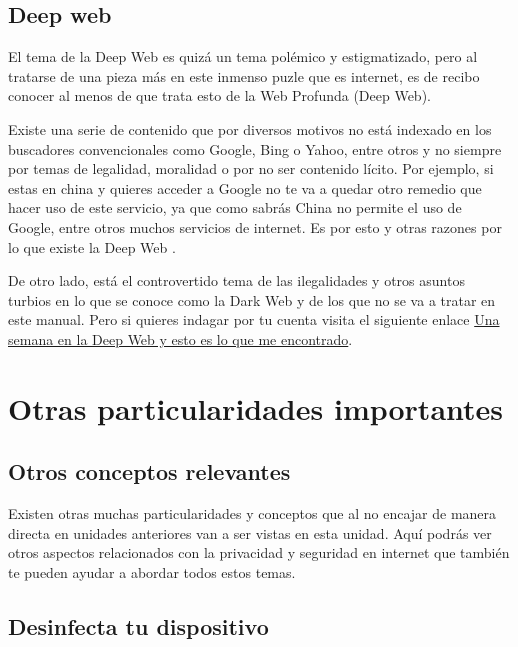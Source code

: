 \documentclass[
  a4paper,
  openany]{book}
\begin{document}
\hypertarget{deep-web}{%
\section{Deep web}\label{deep-web}}

El tema de la Deep Web es quizá un tema polémico y estigmatizado, pero al tratarse de una pieza más en este inmenso puzle que es internet, es de recibo conocer al menos de que trata esto de la Web Profunda (Deep Web).

Existe una serie de contenido que por diversos motivos no está indexado en los buscadores convencionales como Google, Bing o Yahoo, entre otros y no siempre por temas de legalidad, moralidad o por no ser contenido lícito. Por ejemplo, si estas en china y quieres acceder a Google no te va a quedar otro remedio que hacer uso de este servicio, ya que como sabrás China no permite el uso de Google, entre otros muchos servicios de internet. Es por esto y otras razones por lo que existe la Deep Web \citep{OSI-deep-web}.

De otro lado, está el controvertido tema de las ilegalidades y otros asuntos turbios en lo que se conoce como la Dark Web y de los que no se va a tratar en este manual. Pero si quieres indagar por tu cuenta visita el siguiente enlace \href{https://www.xataka.com/analisis/una-semana-en-la-deep-web-esto-es-lo-que-me-he-encontrado}{Una semana en la Deep Web y esto es lo que me encontrado}.

\hypertarget{otras-particularidades-importantes}{%
\chapter{Otras particularidades importantes}\label{otras-particularidades-importantes}}

\hypertarget{otros-conceptos-relevantes}{%
\section{Otros conceptos relevantes}\label{otros-conceptos-relevantes}}

Existen otras muchas particularidades y conceptos que al no encajar de manera directa en unidades anteriores van a ser vistas en esta unidad. Aquí podrás ver otros aspectos relacionados con la privacidad y seguridad en internet que también te pueden ayudar a abordar todos estos temas.

\hypertarget{desinfecta-tu-dispositivo}{%
\section{Desinfecta tu dispositivo}\label{desinfecta-tu-dispositivo}}
\end{document}
